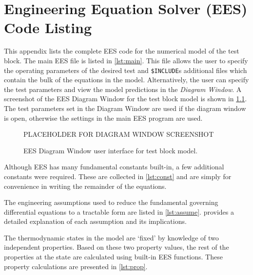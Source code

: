\chapter{Engineering Equation Solver (EES) Code Listing} \label{app:code}

This appendix lists the complete EES code for the numerical model of the test block.
The main EES file is listed in \cref{lst:main}. This file allows the user to specify
the operating parameters of the desired test and \verb+$INCLUDE+s additional files
which contain 
the bulk of the equations in the model. 
Alternatively, the user can specify the test parameters and view the model 
predictions in the \emph{Diagram Window}. A screenshot of the EES Diagram Window 
for the test block model is shown in \cref{fig:DiagWindow}. The test parameters
set in the Diagram Window are used if the diagram window is open, otherwise the
settings in the main EES program 
are used.
\begin{figure}[htbp]
	\centering
	PLACEHOLDER FOR DIAGRAM WINDOW SCREENSHOT
	\caption{EES Diagram Window user interface for test block model.}
	\label{fig:DiagWindow}
\end{figure}

Although EES has many fundamental constants built-in, a few additional constants
were required. These are collected in \cref{lst:const} and are simply for convenience
in writing the remainder of the equations.
%

The engineering assumptions used to reduce the fundamental governing differential
equations to a tractable form are listed in \cref{lst:assume}. 
provides a detailed explanation of each assumption and its implications.
%

The thermodynamic states in the model are `fixed' by knowledge of two independent
properties. Based on these two property values, the rest of the properties at the
state are calculated using built-in EES functions. These property calculations are
presented in \cref{lst:prop}. 
%

